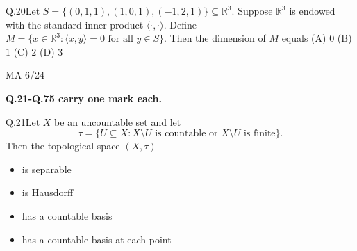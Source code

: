 \documentclass{article}
\begin{document}
																										\vspace{1em}

																										Q.20\quad Let $S = \{(0,1,1), (1,0,1), (-1,2,1)\} \subseteq \mathbb{R}^3$. Suppose $\mathbb{R}^3$ is endowed with the standard inner product $\langle \cdot , \cdot \rangle$. Define $M = \{x \in \mathbb{R}^3 : \langle x, y \rangle = 0 \text{ for all } y \in S\}$. Then the dimension of $M$ equals
																										\vspace{1em}
																										\newline 
																										\noindent (A) $0$ \hspace{2cm} (B) $1$ \hspace{2cm}(C) $2$ \hspace{2cm} (D) $3$

																										\vspace{25em}
																										\begin{center}
																										    {MA 6/24}
																										    \end{center}
																										    \newpage
																										    \begin{center}
																										        \textbf{Q.21-Q.75 carry one mark each.}
																											\end{center}
																											\vspace{2em}
																											Q.21\quad Let $X$ be an uncountable set and let
																											\[
																											\tau = \{U \subseteq X : X \setminus U \text{ is countable or } X \setminus U \text{ is finite} \}.
																											\]
																											Then the topological space $(X, \tau)$
																											\begin{itemize}
																											    \item[(A)] is separable
																											        \item[(B)] is Hausdorff
																												    \item[(C)] has a countable basis
																												        \item[(D)] has a countable basis at each point
																													\end{itemize}

																													\vspace{1em}
\end{document}
